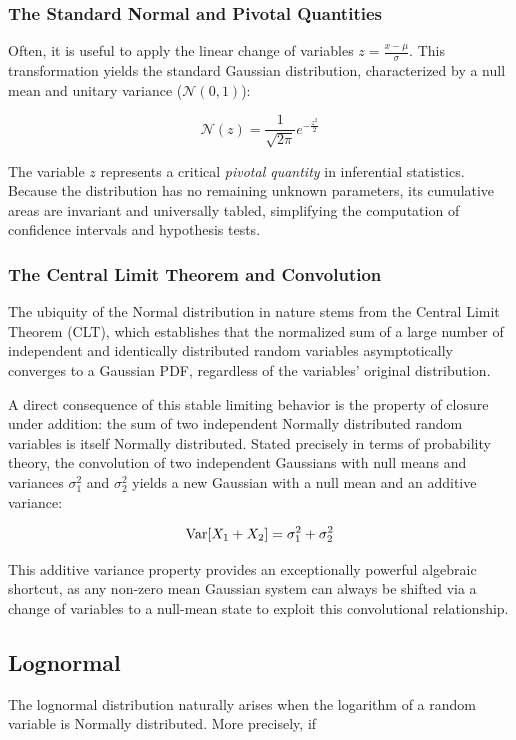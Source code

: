 \subsubsection{The Standard Normal and Pivotal Quantities}
Often, it is useful to apply the linear change of variables $z = \frac{x-\mu}{\sigma}$. This transformation yields the standard Gaussian distribution, characterized by a null mean and unitary variance ($\mathcal{N}(0,1)$):

\[
\mathcal{N}\left(z\right) = \frac{1}{\sqrt{2\pi}}e^{-\frac{z^2}{2}}
\]

The variable $z$ represents a critical \textit{pivotal quantity} in inferential statistics. Because the distribution has no remaining unknown parameters, its cumulative areas are invariant and universally tabled, simplifying the computation of confidence intervals and hypothesis tests.

\subsubsection{The Central Limit Theorem and Convolution}
The ubiquity of the Normal distribution in nature stems from the Central Limit Theorem (CLT), which establishes that the normalized sum of a large number of independent and identically distributed random variables asymptotically converges to a Gaussian PDF, regardless of the variables' original distribution.

A direct consequence of this stable limiting behavior is the property of closure under addition: the sum of two independent Normally distributed random variables is itself Normally distributed. Stated precisely in terms of probability theory, the convolution of two independent Gaussians with null means and variances $\sigma_1^2$ and $\sigma_2^2$ yields a new Gaussian with a null mean and an additive variance:

\[
\operatorname{Var}[X_1 + X_2] = \sigma_1^2 + \sigma_2^2
\]

This additive variance property provides an exceptionally powerful algebraic shortcut, as any non-zero mean Gaussian system can always be shifted via a change of variables to a null-mean state to exploit this convolutional relationship.

\clearpage
\subsection{Lognormal}

The lognormal distribution naturally arises when the logarithm of a random variable is Normally distributed. More precisely, if

